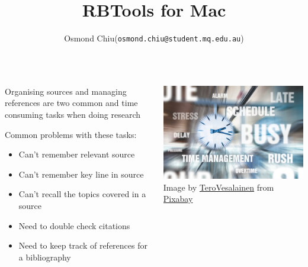 \documentclass[unknownkeysallowed,usepdftitle=false, parskip=full]{beamer}
\title{RBTools for Mac}
\author{Osmond Chiu\inst (\texttt{osmond.chiu@student.mq.edu.au})}
\institute{Macquarie University}
\newcommand{\secvariable}{nothing}
\newcommand{\mysection}[1]{\renewcommand{\secvariable}{#1}
}
\begin{document}
\mysection{abstract}
\begin{frame}\label{\secvariable}



\parbox{\linewidth}{

\begin{columns}[t]
    \begin{column}[c]{0.5\textwidth}

Organising sources and managing references are two common and time consuming tasks when doing research

 \vspace{12pt}

Common problems with these tasks:
\begin{itemize}
\item Can't remember relevant source
\item Can't remember key line in source
\item Can't recall the topics covered in a source
\item Need to double check citations
\item Need to keep track of references for a bibliography
\end{itemize}

 \end{column}
    \begin{column}[c]{0.5\textwidth}
\includegraphics[width=1\textwidth,height=0.5\textheight,keepaspectratio]{stress.jpg}\\
Image by \href{https://pixabay.com/users/TeroVesalainen-809550/?utm_source=link-attribution&amp;utm_medium=referral&amp;utm_campaign=image&amp;utm_content=2119711}{TeroVesalainen} from \href{https://pixabay.com/?utm_source=link-attribution&amp;utm_medium=referral&amp;utm_campaign=image&amp;utm_content=2119711}{Pixabay}

 \vspace{12pt}
 
   \end{column}
  \end{columns}

}

   
\end{frame}
\end{document}
